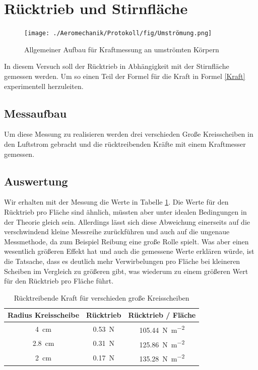 \section{Rücktrieb und Stirnfläche}

\begin{figure}[h!]
    \centering
    \texttt{[image: ./Aeromechanik/Protokoll/fig/Umströmung.png]}
    \caption{Allgemeiner Aufbau für Kraftmessung an umströmten Körpern}
    \label{fig:Venturi}
\end{figure}

In diesem Versuch soll der Rücktrieb in Abhängigkeit mit der Stirnfläche gemessen werden. Um so einen Teil der Formel für die Kraft in Formel \ref{Kraft} experimentell herzuleiten.

\subsection{Messaufbau}

Um diese Messung zu realisieren werden drei verschieden Große Kreisscheiben in den Luftstrom gebracht und die rücktreibenden Kräfte mit einem Kraftmesser gemessen.

\subsection{Auswertung}

Wir erhalten mit der Messung die Werte in Tabelle \ref{tab:Aufgabe2.1}. Die Werte für den Rücktrieb pro Fläche sind ähnlich, müssten aber unter idealen Bedingungen in der Theorie gleich sein. Allerdings lässt sich diese Abweichung einerseits auf die verschwindend kleine Messreihe zurückführen und auch auf die ungenaue Messmethode, da zum Beispiel Reibung eine große Rolle spielt. Was aber einen wesentlich größeren Effekt hat und auch die gemessene Werte erklären würde, ist die Tatsache, dass es deutlich mehr Verwirbelungen pro Fläche bei kleineren Scheiben im Vergleich zu größeren gibt, was wiederum zu einem größeren Wert für den Rücktrieb pro Fläche führt.

\begin{table}[h!]
    \caption{Rücktreibende Kraft für verschieden große Kreisscheiben}
    \centering
    \begin{tabular}{c c c}
    \hline
    Radius Kreisscheibe     & Rücktrieb  & Rücktrieb / Fläche\\
    \hline
    \SI{4}{\centi\metre}     & \SI{0.53}{\newton} & \SI{105.44}{\newton\per\square\metre}\\[5pt]
    \SI{2.8}{\centi\metre}  &   \SI{0.31}{\newton} & \SI{125.86}{\newton\per\square\metre} \\[5pt]
    \SI{2}{\centi\metre}    &   \SI{0.17}{\newton} & \SI{135.28}{\newton\per\square\metre} \\[5pt]
    \hline
    \end{tabular}
    \label{tab:Aufgabe2.1}
\end{table}

